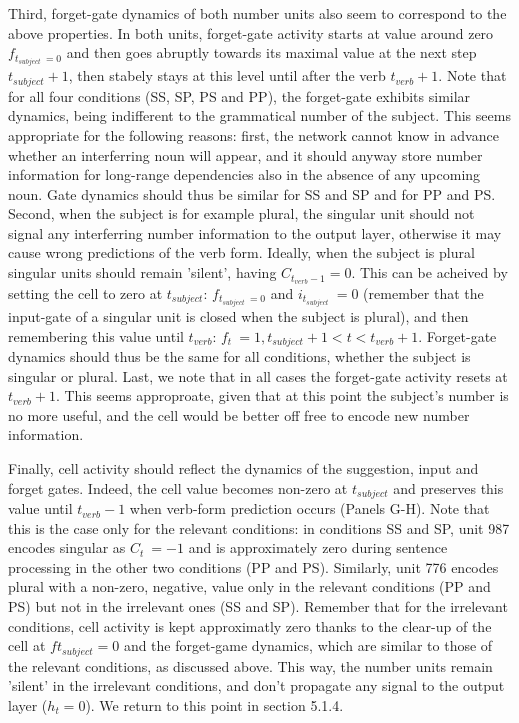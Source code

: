 Third, forget-gate dynamics of both number units also seem to correspond to the above properties. In both units, forget-gate activity starts at value around zero $f_{t_{subject}~=0}$ and then goes abruptly towards its maximal value at the next step $t_{subject}+1$, then stabely stays at this level until after the verb $t_{verb}+1$. Note that for all four conditions (SS, SP, PS and PP), the forget-gate exhibits similar dynamics, being indifferent to the grammatical number of the subject. This seems appropriate for the following reasons: first, the network cannot know in advance whether an interferring noun will appear, and it should anyway store number information for long-range dependencies also in the absence of any upcoming noun. Gate dynamics should thus be similar for SS and SP and for PP and PS. Second, when the subject is for example plural, the singular unit should not signal any interferring number information to the output layer, otherwise it may cause wrong predictions of the verb form. Ideally, when the subject is plural singular units should remain 'silent', having $C_{t_{verb}-1}=0$. This can be acheived by setting the cell to zero at $t_{subject}$: $f_{t_{subject}~=0}$ and $i_{t_{subject}}~=0$ (remember that the input-gate of a singular unit is closed when the subject is plural), and then remembering this value until $t_{verb}$: $f_t ~= 1, t_{subject}+1<t<t_{verb}+1$. Forget-gate dynamics should thus be the same for all conditions, whether the subject is singular or plural. Last, we note that in all cases the forget-gate activity resets at $t_{verb}+1$. This seems approproate, given that at this point the subject's number is no more useful, and the cell would be better off free to encode new number information.
 
Finally, cell activity should reflect the dynamics of the suggestion, input and forget gates. Indeed, the cell value becomes non-zero at $t_{subject}$ and preserves this value until $t_{verb}-1$ when verb-form prediction occurs (Panels G-H). Note that this is the case only for the relevant conditions: in conditions SS and SP, unit 987 encodes singular as $C_t ~= -1$ and is approximately zero during sentence processing in the other two conditions (PP and PS). Similarly, unit 776 encodes plural with a non-zero, negative, value only in the relevant conditions (PP and PS) but not in the irrelevant ones (SS and SP). Remember that for the irrelevant conditions, cell activity is kept approximatly zero thanks to the clear-up of the cell at $f{t_{subject}}=0$ and the forget-game dynamics, which are similar to those of the relevant conditions, as discussed above. This way, the number units remain 'silent' in the irrelevant conditions, and don't propagate any signal to the output layer ($h_t=0$). We return to this point in section 5.1.4.

